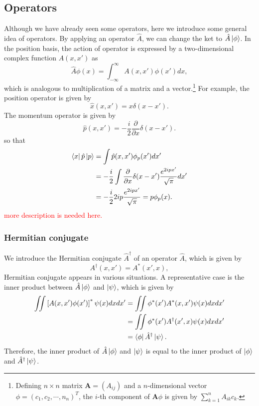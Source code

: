 \documentclass{book}
\begin{document}
\subsection{Operators}
Although we have already seen some operators, here we introduce some general idea of operators. By applying an operator $\hat A$, we can change the ket to $\hat A \ket \phi$. In the position basis,  the action of operator is expressed by a two-dimensional complex function $A(x,x')$ as
\begin{equation}
  \hat A\phi(x) = \int_{-\infty}^{\infty}A(x,x')\phi(x')dx,
\end{equation}
which is analogous to multiplication of a matrix and a vector.\footnote{Defining $n \times n$ matrix $\mathbf A = (A_{ij})$ and a $n$-dimensional vector $\phi = (c_1, c_2,\cdots, n_n )^T$, the $i$-th component of $\mathbf A \phi$ is given by $\sum_{k=1}^{n}A_{ik}c_k$.} For example, the position operator is given by
\begin{equation}
  \hat x(x,x') = x\delta(x-x').
\end{equation}
The momentum operator is given by
\begin{equation}
  \hat p(x,x') = -\frac{i}{2}\frac{\partial}{\partial x}\delta(x-x').
\end{equation}
so that 
\begin{equation}
\begin{aligned}	
  \bra x\hat p\ket p &= \int \hat p(x,x')\phi_p(x')dx' \\
  &= -\frac i 2 \int \frac{\partial}{\partial x}\delta(x-x')\frac{e^{2ipx'}}{\sqrt \pi}dx' \\
  &= -\frac i 2 2ip\frac{e^{2ipx'}}{\sqrt \pi} = p\phi_p(x).
\end{aligned}
\end{equation}
\textcolor{red}{more description is needed here.}

\subsubsection{Hermitian conjugate}
We introduce the Hermitian conjugate $\hat A^\dagger$ of an operator $\hat A$, which is given by
\begin{equation}
  A^\dagger(x,x') = A^*(x',x),
\end{equation}
Hermitian conjugate appears in various situations. A representative case is the inner product between $\hat A\ket \phi$ and $\ket \psi$, which is given by
\begin{equation}
\begin{aligned}
	  \iint\left[A(x,x')\phi(x')\right]^*\psi(x)dxdx' &= \iint \phi^*(x')A^*(x,x')\psi(x)dxdx' \\
	  &= \iint \phi^*(x')A^\dagger(x',x)\psi(x)dxdx'\\
	  &= \bra \phi \hat A^\dagger \ket \psi.
\end{aligned}
\end{equation}
Therefore, the inner product of $\hat A \ket \phi$ and $\ket \psi$ is equal to the inner product of $\ket \phi$ and $\hat A^\dagger \ket \psi$.
\end{document}
